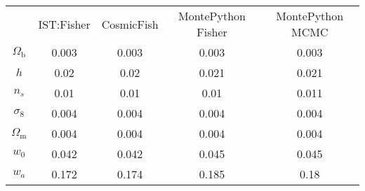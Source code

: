 \begin{table}
\centering
\begin{tabular}{|c|c|c|c|c|}
 & IST:Fisher & CosmicFish & MontePython Fisher & MontePython MCMC \\
$\Omega_\mathrm{b}$ & 0.003 & 0.003 & 0.003 & 0.003 \\
$h$ & 0.02 & 0.02 & 0.021 & 0.021 \\
$n_s$ & 0.01 & 0.01 & 0.01 & 0.011 \\
$\sigma_8$ & 0.004 & 0.004 & 0.004 & 0.004 \\
$\Omega_\mathrm{m}$ & 0.004 & 0.004 & 0.004 & 0.004 \\
$w_0$ & 0.042 & 0.042 & 0.045 & 0.045 \\
$w_a$ & 0.172 & 0.174 & 0.185 & 0.18 \\
\end{tabular}
\end{table}
